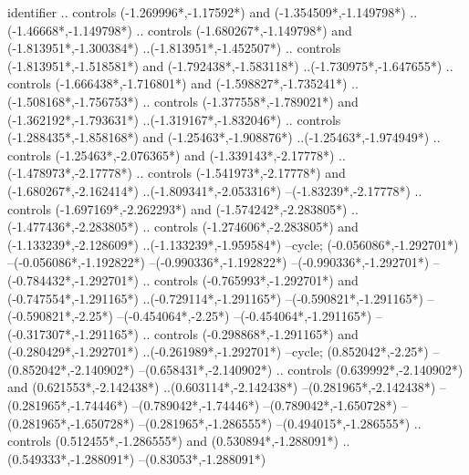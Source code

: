 {\begin{scope}[x=1mm,y=1mm,line width=\SCstroke mm,line cap=round,line join=round]
\begin{SCpart}{identifier}
.. controls ({-1.269996*\SCF},{-1.17592*\SCF}) and ({-1.354509*\SCF},{-1.149798*\SCF}) ..({-1.46668*\SCF},{-1.149798*\SCF})
.. controls ({-1.680267*\SCF},{-1.149798*\SCF}) and ({-1.813951*\SCF},{-1.300384*\SCF}) ..({-1.813951*\SCF},{-1.452507*\SCF})
.. controls ({-1.813951*\SCF},{-1.518581*\SCF}) and ({-1.792438*\SCF},{-1.583118*\SCF}) ..({-1.730975*\SCF},{-1.647655*\SCF})
.. controls ({-1.666438*\SCF},{-1.716801*\SCF}) and ({-1.598827*\SCF},{-1.735241*\SCF}) ..({-1.508168*\SCF},{-1.756753*\SCF})
.. controls ({-1.377558*\SCF},{-1.789021*\SCF}) and ({-1.362192*\SCF},{-1.793631*\SCF}) ..({-1.319167*\SCF},{-1.832046*\SCF})
.. controls ({-1.288435*\SCF},{-1.858168*\SCF}) and ({-1.25463*\SCF},{-1.908876*\SCF}) ..({-1.25463*\SCF},{-1.974949*\SCF})
.. controls ({-1.25463*\SCF},{-2.076365*\SCF}) and ({-1.339143*\SCF},{-2.17778*\SCF}) ..({-1.478973*\SCF},{-2.17778*\SCF})
.. controls ({-1.541973*\SCF},{-2.17778*\SCF}) and ({-1.680267*\SCF},{-2.162414*\SCF}) ..({-1.809341*\SCF},{-2.053316*\SCF})
--({-1.83239*\SCF},{-2.17778*\SCF})
.. controls ({-1.697169*\SCF},{-2.262293*\SCF}) and ({-1.574242*\SCF},{-2.283805*\SCF}) ..({-1.477436*\SCF},{-2.283805*\SCF})
.. controls ({-1.274606*\SCF},{-2.283805*\SCF}) and ({-1.133239*\SCF},{-2.128609*\SCF}) ..({-1.133239*\SCF},{-1.959584*\SCF})
--cycle;
 ({-0.056086*\SCF},{-1.292701*\SCF})
--({-0.056086*\SCF},{-1.192822*\SCF})
--({-0.990336*\SCF},{-1.192822*\SCF})
--({-0.990336*\SCF},{-1.292701*\SCF})
--({-0.784432*\SCF},{-1.292701*\SCF})
.. controls ({-0.765993*\SCF},{-1.292701*\SCF}) and ({-0.747554*\SCF},{-1.291165*\SCF}) ..({-0.729114*\SCF},{-1.291165*\SCF})
--({-0.590821*\SCF},{-1.291165*\SCF})
--({-0.590821*\SCF},{-2.25*\SCF})
--({-0.454064*\SCF},{-2.25*\SCF})
--({-0.454064*\SCF},{-1.291165*\SCF})
--({-0.317307*\SCF},{-1.291165*\SCF})
.. controls ({-0.298868*\SCF},{-1.291165*\SCF}) and ({-0.280429*\SCF},{-1.292701*\SCF}) ..({-0.261989*\SCF},{-1.292701*\SCF})
--cycle;
 ({0.852042*\SCF},{-2.25*\SCF})
--({0.852042*\SCF},{-2.140902*\SCF})
--({0.658431*\SCF},{-2.140902*\SCF})
.. controls ({0.639992*\SCF},{-2.140902*\SCF}) and ({0.621553*\SCF},{-2.142438*\SCF}) ..({0.603114*\SCF},{-2.142438*\SCF})
--({0.281965*\SCF},{-2.142438*\SCF})
--({0.281965*\SCF},{-1.74446*\SCF})
--({0.789042*\SCF},{-1.74446*\SCF})
--({0.789042*\SCF},{-1.650728*\SCF})
--({0.281965*\SCF},{-1.650728*\SCF})
--({0.281965*\SCF},{-1.286555*\SCF})
--({0.494015*\SCF},{-1.286555*\SCF})
.. controls ({0.512455*\SCF},{-1.286555*\SCF}) and ({0.530894*\SCF},{-1.288091*\SCF}) ..({0.549333*\SCF},{-1.288091*\SCF})
--({0.83053*\SCF},{-1.288091*\SCF})

\end{SCpart}
\end{scope}}
